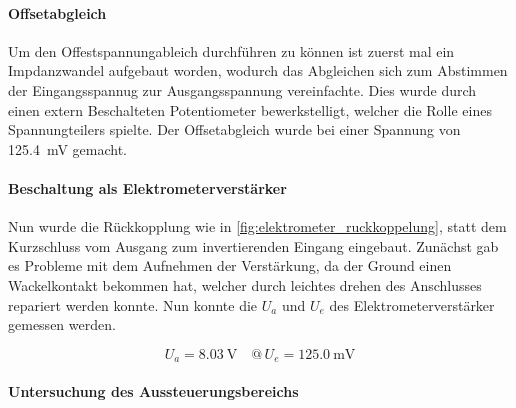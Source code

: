 \documentclass[12pt,english,ngerman]{scrartcl}
\begin{document}
\paragraph{Offsetabgleich}
Um den Offestspannungableich durchführen zu können ist zuerst mal ein
Impdanzwandel aufgebaut worden, wodurch das Abgleichen sich zum Abstimmen
der Eingangsspannug zur Ausgangsspannung vereinfachte. Dies wurde durch einen
extern Beschalteten Potentiometer bewerkstelligt, welcher die Rolle eines
Spannungteilers spielte. Der Offsetabgleich wurde bei einer Spannung von
\SI{125.4}{\milli\volt} gemacht.

\paragraph{Beschaltung als Elektrometerverstärker}
Nun wurde die Rückkopplung wie in \autoref{fig:elektrometer_ruckkoppelung},
statt dem Kurzschluss vom Ausgang zum invertierenden Eingang eingebaut.
Zunächst gab es Probleme mit dem Aufnehmen der Verstärkung, da der Ground einen
Wackelkontakt bekommen hat, welcher durch leichtes drehen des Anschlusses
repariert werden konnte.
Nun konnte die $U_a$ und $U_e$ des Elektrometerverstärker gemessen werden.

\begin{equation}
  U_a = \SI{8.03}{\volt} \quad @\, U_e = \SI{125.0}{\milli\volt}
  \label{eq:messwert_elektro_ausgang_eingang}
\end{equation}

\paragraph{Untersuchung des Aussteuerungsbereichs} \label{sec:Versuchohnekond}
\end{document}
